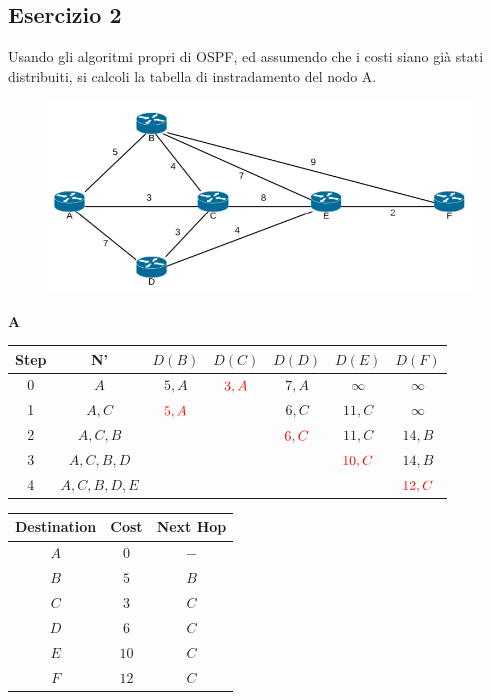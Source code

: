 \documentclass[10pt]{article}
\begin{document}
	\subsection{Esercizio 2}
	Usando gli algoritmi propri di OSPF, ed assumendo che i costi siano già stati distribuiti, si calcoli la tabella di instradamento del nodo A.
	\begin{figure}[h]
	\centering
	\includegraphics[width=13cm]{es2}
	\end{figure}
	\begin{center}
	\textbf{A}
 		\begin{tabular}{||c c c c c c c||} 
 			\hline
 			Step & N' & $D(B)$ & $D(C)$ & $D(D)$ & $D(E)$ & $D(F)$ \\[0.5ex] 
 			\hline\hline
 			0 & $A$ & $5,A$ & $\color{red} 3,A$ & $7,A$ & $\infty$ & $\infty$ \\ 
 			\hline
 			1 & $A,C$ & $\color{red} 5,A$ & & $6,C$ & $11,C$ & $\infty$ \\ 
 			\hline
 			2 & $A,C,B$ & & & $\color{red} 6,C$ & $11,C$ & $14,B$ \\
 			\hline
 			3 & $A,C,B,D$ & & & & $\color{red} 10,C$ & $14,B$ \\
 			\hline
 			4 & $A,C,B,D,E$ & & & & & $\color{red} 12,C$ \\[0.5ex] 
 			\hline
		\end{tabular}
		\quad
		\begin{tabular}{||c || c || c||}
			\hline
 			Destination & Cost & Next Hop\\[0.5ex] 
 			\hline\hline
			$A$ & $0$ & $-$\\
			$B$ & $5$ & $B$\\
 			$C$ & $3$ & $C$\\
			$D$ & $6$ & $C$\\
			$E$ & $10$ & $C$\\
			$F$ & $12$ & $C$\\[0.5ex] 
			\hline
		\end{tabular}
	\end{center}
	
\end{document}
